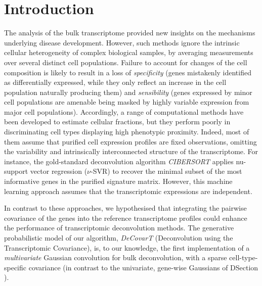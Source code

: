 \documentclass[pdflatex, sn-nature]{sn-jnl}
\theoremstyle{thmstyleone}%
\theoremstyle{thmstyletwo}%
\theoremstyle{thmstylethree}%
\begin{document}
    \section{Introduction}
    \label{sec1} The analysis of the bulk transcriptome provided new insights on
    the mechanisms underlying disease development. However, such methods ignore the
    intrinsic cellular heterogeneity of complex biological samples, by averaging
    measurements over several distinct cell populations. Failure to account for changes
    of the cell composition is likely to result in a loss of \emph{specificity}
    (genes mistakenly identified as differentially expressed, while they only
    reflect an increase in the cell population naturally producing them) and \emph{sensibility}
    (genes expressed by minor cell populations are amenable being masked by highly
    variable expression from major cell populations).
    Accordingly, a range of computational methods have been developed to
    estimate cellular fractions, but they perform poorly in discriminating cell types
    displaying high phenotypic proximity. Indeed, most of them assume that purified
    cell expression profiles are fixed observations, omitting the variability
    and intrinsically interconnected structure of the transcriptome. For instance,
    the gold-standard deconvolution algorithm \emph{CIBERSORT} \cite{newmanRobustEnumerationCell2015}
    applies nu-support vector regression ($\nu$-SVR) to recover the minimal subset
    of the most informative genes in the purified signature matrix. However, this
    machine learning approach assumes that the transcriptomic expressions are independent.

    In contrast to these approaches, we hypothesised that integrating the
    pairwise covariance of the genes into the reference transcriptome profiles
    could enhance the performance of transcriptomic deconvolution methods. The generative
    probabilistic model of our algorithm, \emph{DeCovarT} (Deconvolution using
    the Transcriptomic Covariance), is, to our knowledge, the first
    implementation of a \emph{multivariate} Gaussian convolution for bulk
    deconvolution, with a sparse cell-type-specific covariance (in contrast
    to the univariate, gene-wise Gaussians of DSection
    \cite{erkkilaProbabilisticAnalysisGene2010}).
\end{document}
